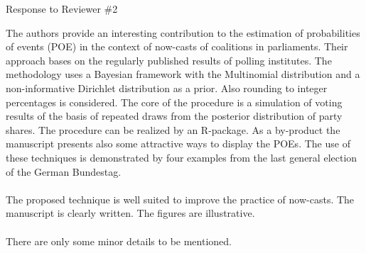 \documentclass{scrartcl}
\begin{document}
\pagebreak
\begin{center}
\large Response to Reviewer \#2
\end{center}
\vspace{5ex}

The authors provide an interesting contribution to the estimation of probabilities of events (POE) in the context of now-casts of coalitions in parliaments. Their approach bases on the regularly published results of polling institutes. The methodology uses a Bayesian framework with the Multinomial distribution and a non-informative Dirichlet distribution as a prior. Also rounding to integer percentages is considered. The core of the procedure is a simulation of voting results of the basis of repeated draws from the posterior distribution of party shares. The procedure can be realized by an R-package. As a by-product the manuscript presents also some attractive ways to display the POEs. The use of these techniques is demonstrated by four examples from the last general election of the German Bundestag.
\\ \\
The proposed technique is well suited to improve the practice of now-casts. The manuscript is clearly written. The figures are illustrative.
\\ \\
There are only some minor details to be mentioned.
\end{document}
